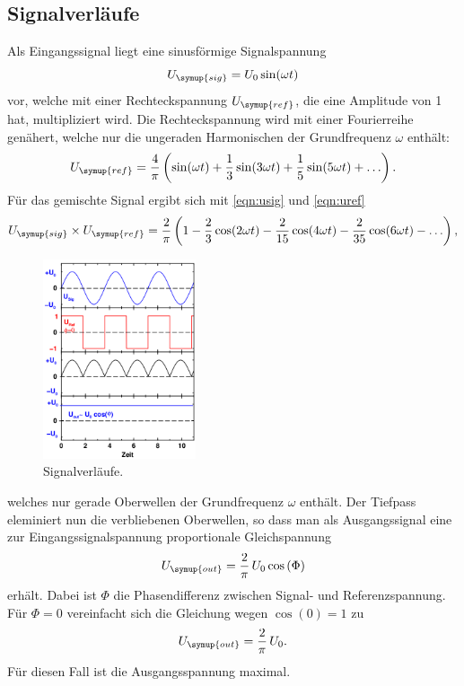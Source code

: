   \subsection{Signalverläufe}
  Als Eingangssignal liegt eine sinusförmige Signalspannung
  \begin{equation}
    U_\symup{sig} = U_0 \sin(\omega t)
    \label{eqn:usig}
  \end{equation}
  vor, welche mit einer Rechteckspannung $U_\symup{ref}$, die eine Amplitude von
  1 hat, multipliziert wird.
  Die Rechteckspannung wird mit einer Fourierreihe genähert, welche nur die ungeraden
  Harmonischen der Grundfrequenz $\omega$ enthält:
  \begin{equation}
    U_\symup{ref}=\frac{4}{\pi}\left(\sin(\omega t) + \frac{1}{3}\sin(3\omega t)
    + \frac{1}{5}\sin(5\omega t) + \ldots\right).
    \label{eqn:uref}
  \end{equation}
  Für das gemischte Signal ergibt sich mit \eqref{eqn:usig} und \eqref{eqn:uref}
  \begin{equation}
    U_\symup{sig}\times U_\symup{ref} = \frac{2}{\pi}\left(1-\frac{2}{3}\cos(2\omega t)
    -\frac{2}{15}\cos(4\omega t) -\frac{2}{35}\cos(6\omega t) - \ldots\right),
    \label{eqn:umisch}
  \end{equation}
  \begin{figure}
    \centering
    \vspace{-15pt}
    \includegraphics[width=0.4\textwidth]{signalverlaeufe.png}
    \caption{Signalverläufe.}
    \label{fig:signalverlaeufe}
  \end{figure}
  welches nur gerade Oberwellen der Grundfrequenz $\omega$ enthält.
  Der Tiefpass eleminiert nun die verbliebenen Oberwellen, so dass man als Ausgangssignal
  eine zur Eingangssignalspannung proportionale Gleichspannung
  \begin{equation}
    U_\symup{out}=\frac{2}{\pi}\,U_0 \cos\,(\Phi)
    \label{eqn:uout1}
  \end{equation}
  erhält. Dabei ist $\Phi$ die Phasendifferenz zwischen Signal- und Referenzspannung.
  Für $\Phi = 0$ vereinfacht sich die Gleichung wegen $\cos(0)=1$ zu
  \begin{equation}
    U_\symup{out}=\frac{2}{\pi}\,U_0.
    \label{eqn:uout2}
  \end{equation}
  Für diesen Fall ist die Ausgangsspannung maximal.
\cite{sample}
